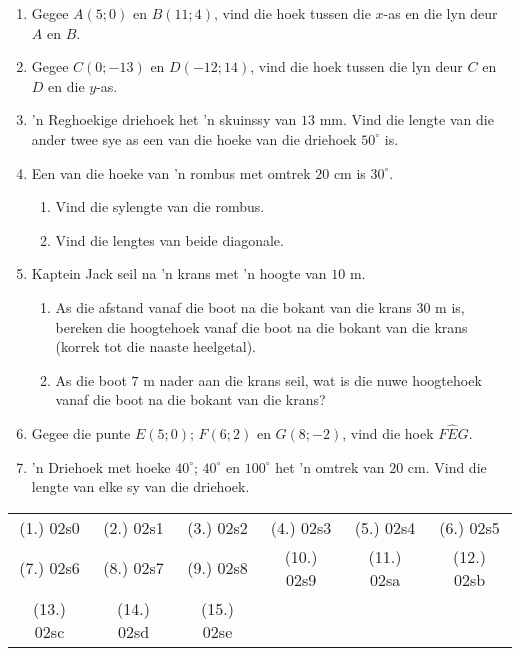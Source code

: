 \begin{eocexercises}{}
\begin{enumerate}[itemsep=6pt, label=\textbf{\arabic*}. ]
\item Gegee $A(5;0)$ en $B(11;4)$, vind die hoek tussen die $x$-as en die lyn deur $A$ en $B$. 
\item Gegee $C(0;-13)$ en $D(-12;14)$, vind die hoek tussen die lyn deur $C$ en $D$ en die $y$-as. 


\item 'n Reghoekige driehoek het 'n skuinssy van $13$ mm. Vind die lengte van die ander twee sye as een van die hoeke van die driehoek $50^{\circ}$ is.
\item Een van die hoeke van 'n rombus met omtrek $20$ cm is $30^{\circ}$. 
\begin{enumerate}[noitemsep, label=\textbf{(\alph*)} ]
\item Vind die sylengte van die rombus. 
\item Vind die lengtes van beide diagonale. 
\end{enumerate} 
\item Kaptein Jack seil na 'n krans met 'n hoogte van $10$ m. 
\begin{enumerate}[noitemsep, label=\textbf{(\alph*)} ] 
\item As die afstand vanaf die boot na die bokant van die krans $30$ m is, bereken die hoogtehoek vanaf die boot na die bokant van die krans (korrek tot die naaste heelgetal).
\item As die boot $7$ m nader aan die krans seil, wat is die nuwe hoogtehoek vanaf die boot na die bokant van die krans? 
\end{enumerate} 
\item Gegee die punte $E(5;0)$; $F(6;2)$ en $G(8;-2)$, vind die hoek $F\hat{E}G$. 
\item  'n Driehoek met hoeke $40^{\circ}$; $40^{\circ}$ en $100^{\circ}$ het 'n omtrek van $20$ cm. Vind die lengte van elke sy  van die driehoek. 

\end{enumerate}

\par \practiceinfo
\par \begin{tabular}[h]{cccccc}
(1.)	02s0	&
(2.)	02s1	&
(3.)	02s2	&
(4.)	02s3	&
(5.)	02s4	&
(6.)	02s5	\\ %
(7.)	02s6	&
(8.)	02s7	&
(9.)	02s8	&
(10.)	02s9	&
(11.)	02sa	&
(12.)	02sb	\\ %
(13.)	02sc	&
(14.)	02sd	&
(15.)	02se	&
\end{tabular}
\end{eocexercises}




















